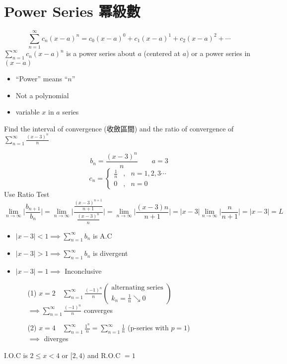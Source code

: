 \section{Power Series 冪級數}
\begin{defn}
\[\displaystyle\sum^{\infty}_{n = 1} c_n (x - a)^n = c_0 (x - a)^0 + c_1 (x - a)^1 + c_2 (x - a)^2 + \cdots\]
\(\displaystyle\sum^{\infty}_{n = 1} c_n (x - a)^n\) is a power series about \(a\) (centered at \(a\)) or a power series in \((x - a)\)
\end{defn}
\begin{notn}
\begin{itemize}
\item ``Power'' means ``\(n\)''
\item Not a polynomial 
\item variable \(x\) in \(a\) series
\end{itemize}
\end{notn}
\begin{eg} Find the interval of convergence (收斂區間) and the ratio of convergence of \(\displaystyle \sum^{\infty}_{n = 1} \frac{(x - 3)^n}{n}\)

\soln
\[\displaystyle b_n = \frac{(x - 3)^n}{n} \quad \quad a = 3\]
\[c_n = \left\{\begin{array}{rcl}
\displaystyle \frac{1}{n} & , & n = 1, 2, 3 \cdots\\
0 & , & n = 0
\end{array}\right.\]
Use Ratio Test
\[\displaystyle \lim_{n \to \infty} \Big| \frac{b_{n + 1}}{b_n} \Big| = \lim_{n \to \infty} \Bigg| \frac{\frac{(x - 3)^{n + 1}}{n + 1}}{\frac{(x - 3)^n}{n}} \Bigg| = \lim_{n \to \infty} \Big| \frac{(x - 3)n}{n + 1} \Big| = |x - 3| \lim_{n \to \infty} \Big| \frac{n}{n + 1} \Big| = |x - 3| = L\]
\begin{itemize}
\item \(|x - 3| < 1 \implies \displaystyle \sum^{\infty}_{n = 1} b_n\) is A.C
\item \(|x - 3| > 1 \implies \displaystyle \sum^{\infty}_{n = 1} b_n\) is divergent
\item \(|x - 3| = 1 \implies\) Inconclusive
\begin{itemize}
\item[(1)] \(x = 2 \quad \displaystyle \sum^{\infty}_{n = 1} \frac{(-1)^n}{n} \left(\begin{array}{l}
\text{alternating series}\\
\displaystyle k_n = \frac{1}{n} \searrow 0
\end{array}\right)\)\\
\(\implies \displaystyle \sum^{\infty}_{n = 1} \frac{(-1)^n}{n}\) converges 
\item[(2)] \(x = 4 \quad \displaystyle \sum^{\infty}_{n = 1} \frac{1^n}{n} = \sum^{\infty}_{n = 1} \frac{1}{n}\) \quad (p-series with \(p = 1\))\\
\(\implies\) diverges 
\end{itemize}
\end{itemize}
I.O.C is \( 2 \leq x < 4\) or \([2, 4)\) and R.O.C \(=1\)
\end{eg}
